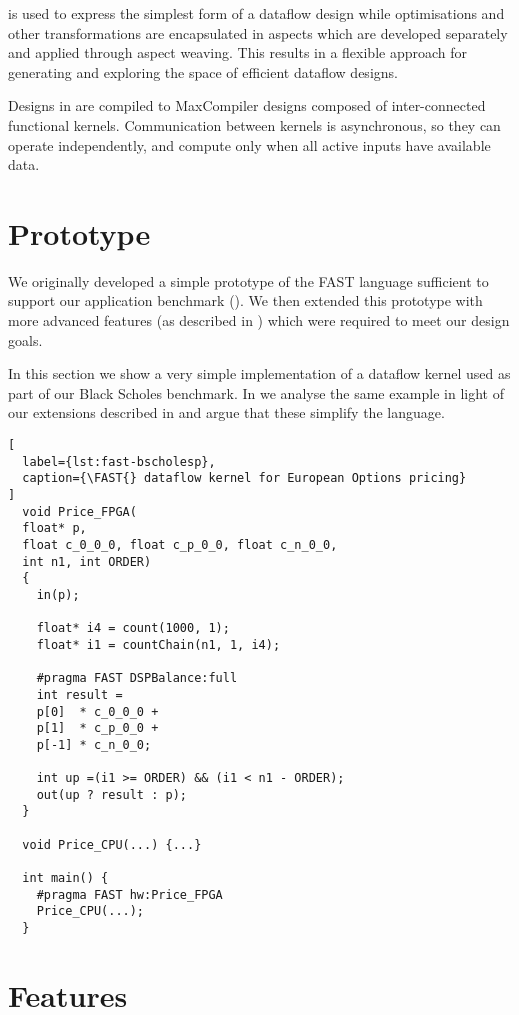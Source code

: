 \FAST{} is used to express the simplest form of a dataflow design
while optimisations and other transformations are encapsulated in
aspects which are developed separately and applied through aspect
weaving. This results in a flexible approach for generating and
exploring the space of efficient dataflow designs.

Designs in \FAST{} are compiled to MaxCompiler designs composed of
inter-connected functional kernels. Communication between kernels is
asynchronous, so they can operate independently, and compute only when
all active inputs have available data.


\section{Prototype}

We originally developed a simple prototype of the FAST language
sufficient to support our application benchmark (\Cref{}). We then
extended this prototype with more advanced features (as described in
) which were required to meet our design
goals.

In this section we show a very simple implementation of a dataflow
kernel used as part of our Black Scholes benchmark. In
 we analyse the same example in light of our
extensions described in  and argue that
these simplify the language.

\lstset{style=MaxC}

\begin{lstlisting}[
  label={lst:fast-bscholesp},
  caption={\FAST{} dataflow kernel for European Options pricing}
]
  void Price_FPGA(
  float* p,
  float c_0_0_0, float c_p_0_0, float c_n_0_0,
  int n1, int ORDER)
  {
    in(p);

    float* i4 = count(1000, 1);
    float* i1 = countChain(n1, 1, i4);

    #pragma FAST DSPBalance:full
    int result =
    p[0]  * c_0_0_0 +
    p[1]  * c_p_0_0 +
    p[-1] * c_n_0_0;

    int up =(i1 >= ORDER) && (i1 < n1 - ORDER);
    out(up ? result : p);
  }

  void Price_CPU(...) {...}

  int main() {
    #pragma FAST hw:Price_FPGA
    Price_CPU(...);
  }
\end{lstlisting}

\section{Features}

